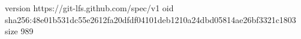 version https://git-lfs.github.com/spec/v1
oid sha256:48e01b531dc55e2612fa20dfdf04101deb1210a24dbd05814ae26bf3321c1803
size 989
